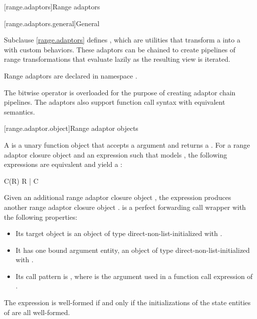 [range.adaptors]{Range adaptors}

[range.adaptors.general]{General}

\pnum
Subclause \ref{range.adaptors} defines , which are utilities that transform a
 into a  with custom behaviors. These
adaptors can be chained to create pipelines of range transformations that
evaluate lazily as the resulting view is iterated.

\pnum
Range adaptors are declared in namespace .

\pnum
The bitwise  operator is overloaded for the purpose of creating adaptor chain
pipelines. The adaptors also support function call syntax with equivalent
semantics.

\pnum
\begin{example}
\end{example}

[range.adaptor.object]{Range adaptor objects}

\pnum
A  is a unary function object that accepts
a  argument and returns a . For
a range adaptor closure object  and an expression  such that
 models , the following
expressions are equivalent and yield a :
\begin{codeblock}
C(R)
R | C
\end{codeblock}
Given an additional range adaptor closure object ,
the expression  produces another range adaptor
closure object .
 is a perfect forwarding call wrapper
with the following properties:
\begin{itemize}
\item
Its target object is an object  of type 
direct-non-list-initialized with .
\item
It has one bound argument entity,
an object  of type 
direct-non-list-initialized with .
\item
Its call pattern is ,
where  is the argument used in
a function call expression of .
\end{itemize}
The expression  is well-formed if and only if
the initializations of the state entities of  are all well-formed.

